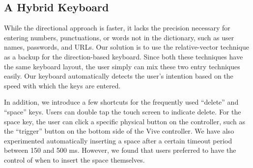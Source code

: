 \subsection{A Hybrid Keyboard}

While the directional approach is faster, it lacks the precision necessary for entering numbers, punctuations, or words not in the dictionary, such as user names, passwords, and URLs.   Our solution is to use the relative-vector technique as a backup for the direction-based keyboard.  Since both these techniques have the same keyboard layout, the user simply can mix these two entry techniques easily.  Our keyboard automatically detects the user's intention based on the speed with which the keys are entered. 

In addition, we introduce a few shortcuts for the frequently used ``delete'' and ``space'' keys.   Users can double tap the touch screen to indicate delete.  For the space key, the user can click a specific physical button on the controller, such as the ``trigger'' button on the bottom side of the Vive controller.  We have also experimented automatically inserting a space after a certain timeout period between 150 and 500 ms.  However, we found that users preferred to have the control of when to insert the space themselves.   

